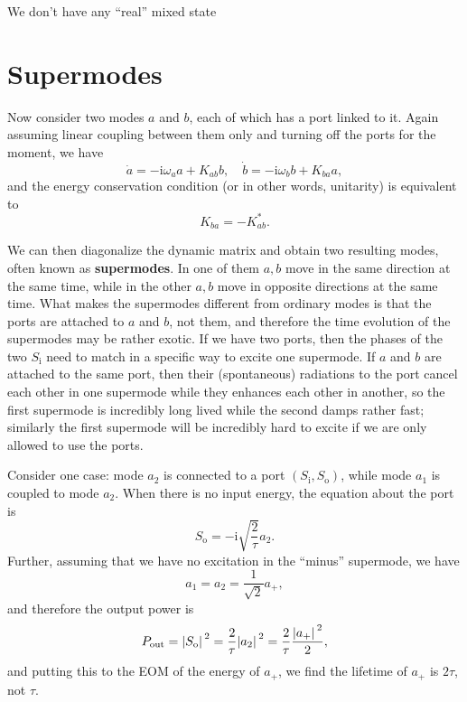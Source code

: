 \documentclass[hyperref, a4paper]{article}
\newcommand*{\ii}{\mathrm{i}}
\newcommand*{\concept}[1]{{\textbf{#1}}}
\newcommand*{\Si}{S_{\text{i}}}
\newcommand*{\So}{S_{\text{o}}}
\begin{document}
We don't have any ``real'' mixed state 

\section{Supermodes}

Now consider two modes $a$ and $b$, 
each of which has a port linked to it.
Again assuming linear coupling between them only and turning off the ports for the moment, we have 
\begin{equation}
    \dot{a} = - \ii \omega_a a + K_{ab} b, \quad 
    \dot{b} = - \ii \omega_b b + K_{ba} a,
\end{equation}
and the energy conservation condition (or in other words, unitarity) is equivalent to
\begin{equation}
    K_{ba} = - K_{ab}^*.
\end{equation}

We can then diagonalize the dynamic matrix and obtain two resulting modes, 
often known as \concept{supermodes}.
In one of them $a, b$ move in the same direction at the same time, 
while in the other $a, b$ move in opposite directions at the same time.
What makes the supermodes different from ordinary modes is that 
the ports are attached to $a$ and $b$, not them, 
and therefore the time evolution of the supermodes may be rather exotic.
If we have two ports, then the phases of the two $\Si$ need to match in a specific way 
to excite one supermode. 
If $a$ and $b$ are attached to the same port, 
then their (spontaneous) radiations to the port cancel each other in one supermode 
while they enhances each other in another, 
so the first supermode is incredibly long lived 
while the second damps rather fast; 
similarly the first supermode will be incredibly hard to excite 
if we are only allowed to use the ports.

Consider one case: mode $a_2$ is connected to a port $(\Si, \So)$,
while mode $a_1$ is coupled to mode $a_2$.
When there is no input energy, the equation about the port is 
\begin{equation}
    \So = - \ii \sqrt{\frac{2}{\tau}} a_2.
\end{equation}
Further, assuming that we have no excitation in the ``minus'' supermode, we have 
\begin{equation}
    a_1 = a_2 = \frac{1}{\sqrt{2}} a_+, 
\end{equation}
and therefore the output power is  
\begin{equation}
    P_{\text{out}} = \abs*{\So}^2 = \frac{2}{\tau} \abs*{a_2}^2
    = \frac{2}{\tau} \frac{\abs*{a_+}^2}{2} ,
\end{equation}
and putting this to the EOM of the energy of $a_+$, 
we find the lifetime of $a_+$ is $2 \tau$, not $\tau$.
\end{document}
